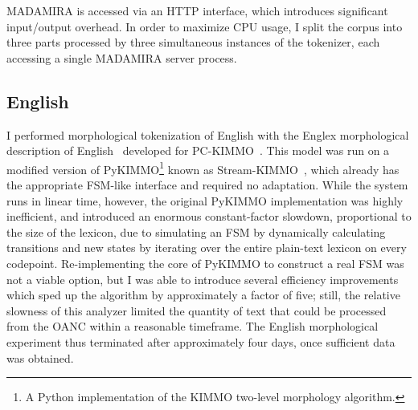 MADAMIRA is accessed via an HTTP interface, which introduces significant input/output overhead. In order to maximize CPU usage, I split the corpus into three parts processed by three simultaneous instances of the tokenizer, each accessing a single MADAMIRA server process.

\subsection{English}
I performed morphological tokenization of English with the Englex morphological description of English~\cite{antworthenglex} developed for PC-KIMMO~\cite{koskenniemi84}. This model was run on a modified version of PyKIMMO\footnote{A Python implementation of the KIMMO two-level morphology algorithm.} known as Stream-KIMMO~\cite{kearsley13}, which already has the appropriate FSM-like interface and required no adaptation. While the system runs in linear time, however, the original PyKIMMO implementation was highly inefficient, and introduced an enormous constant-factor slowdown, proportional to the size of the lexicon, due to simulating an FSM by dynamically calculating transitions and new states by iterating over the entire plain-text lexicon on every codepoint. Re-implementing the core of PyKIMMO to construct a real FSM was not a viable option, but I was able to introduce several efficiency improvements which sped up the algorithm by approximately a factor of five; still, the relative slowness of this analyzer limited the quantity of text that could be processed from the OANC within a reasonable timeframe. The English morphological experiment thus terminated after approximately four days, once sufficient data was obtained.

